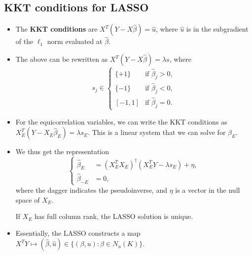 \documentclass[twoside]{article}
\newcommand\lmb{\lambda}
\begin{document}
\subsection{KKT conditions for LASSO}
\begin{itemize}
\item The \textbf{KKT conditions} are $X^T (Y - X \hat{\beta}) = \hat{u}$, where $\hat{u}$ is in the subgradient of the $\ell_1$ norm evaluated at $\hat{\beta}$.

\item The above can be rewritten as $X^T(Y - X\hat{\beta}) = \lmb s$, where
\[ s_j \in \begin{cases} \{+1 \} &\text{if } \hat{\beta}_j > 0, \\ \{ -1 \} &\text{if } \hat{\beta}_j < 0, \\ [-1, 1] &\text{if } \hat{\beta}_j = 0. \end{cases} \]

\item For the equicorrelation variables, we can write the KKT conditions as $X_E^T (Y - X_E \hat{\beta}_E) = \lmb s_E$. This is a linear system that we can solve for $\hat{\beta}_E$.

\item We thus get the representation
\[ \begin{cases} \hat{\beta}_E &= (X_E^T X_E)^\dagger (X_E^T Y - \lmb s_E) + \eta, \\ \hat{\beta}_{-E} &= 0, \end{cases} \]
where the dagger indicates the pseudoinverse, and $\eta$ is a vector in the null space of $X_E$.

If $X_E$ has full column rank, the LASSO solution is unique.

\item Essentially, the LASSO constructs a map $X^T Y \mapsto (\hat{\beta}, \hat{u}) \in \{ (\beta, u): \beta \in N_u(K) \}$.

\end{itemize}
\end{document}
